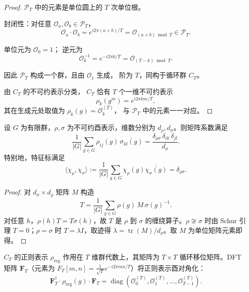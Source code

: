 \begin{proof}
$\mathcal{P}_T$ 中的元素是单位圆上的 $T$ 次单位根。

封闭性：对任意 $\mathcal{O}_a, \mathcal{O}_b \in \mathcal{P}_T$，
\[
\mathcal{O}_a \cdot \mathcal{O}_b
= e^{i2\pi(a+b)/T}
= \mathcal{O}_{(a+b)\bmod T} \in \mathcal{P}_T.
\]

单位元为 $\mathcal{O}_0 = 1$；
逆元为
\[
\mathcal{O}_k^{-1}
= e^{-i2\pi k/T}
= \mathcal{O}_{(T-k)\bmod T}.
\]

因此 $\mathcal{P}_T$ 构成一个群，且由 $\mathcal{O}_1$ 生成，
阶为 $T$，同构于循环群 $C_T$。

由 $C_T$ 的不可约表示分类，
$C_T$ 恰有 $T$ 个一维不可约表示
\[
\rho_k(g^m) = e^{i2\pi km/T},
\]
其在生成元处取值为 $\rho_k(g) = \mathcal{O}_k^{(T)}$，
与 $\mathcal{P}_T$ 中的元素一一对应。
\end{proof}

\begin{proposition}\label{prop:schur_orthogonality}
设 $G$ 为有限群，$\rho,\sigma$ 为不可约酉表示，维数分别为 $d_\rho,d_\sigma$。则矩阵系数满足
\[
\frac{1}{|G|}\sum_{g\in G}\rho_{ij}(g)\,\overline{\sigma_{kl}(g)}
=\frac{\delta_{\rho\sigma}\,\delta_{ik}\,\delta_{jl}}{d_\rho}.
\]
特别地，特征标满足
\[
\langle\chi_\rho,\chi_\sigma\rangle:=\frac{1}{|G|}\sum_{g\in G}\chi_\rho(g)\overline{\chi_\sigma(g)}=\delta_{\rho\sigma}.
\]
\end{proposition}

\begin{proof}
对 $d_\sigma\times d_\rho$ 矩阵 $M$ 构造
\[
T=\frac{1}{|G|}\sum_{g\in G}\rho(g)\,M\,\sigma(g)^{-1}.
\]
对任意 $h$，$\rho(h)T=T\sigma(h)$，故 $T$ 是 $\rho$ 到 $\sigma$ 的缠绕算子。$\rho\not\cong\sigma$ 时由 Schur 引理 $T=0$；$\rho=\sigma$ 时 $T=\lambda I$，取迹得 $\lambda=\operatorname{tr}(M)/d_\rho$。取 $M$ 为单位矩阵元素即得。
\end{proof}

\begin{definition}[正则表示与DFT对角化]\label{def:regular_representation_dft}
$C_T$ 的正则表示 $\rho_{\text{reg}}$ 作用在 $T$ 维群代数上，其矩阵为 $T \times T$ 循环移位矩阵。DFT 矩阵 $\mathbf{F}_T$（元素为 $F_T[m,n] = \frac{1}{\sqrt{T}} e^{-i2\pi mn/T}$）将正则表示酉对角化：
\[
\mathbf{F}_T^\dagger \cdot \rho_{\text{reg}}(g) \cdot \mathbf{F}_T = \operatorname{diag}(\mathcal{O}_0^{(T)}, \mathcal{O}_1^{(T)}, \dots, \mathcal{O}_{T-1}^{(T)}).
\]
\end{definition}

